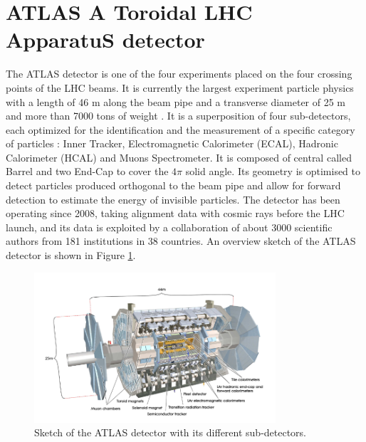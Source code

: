 \section{ATLAS A Toroidal LHC ApparatuS detector}
\label{chap2:ATLAS}
The ATLAS detector is one of the four experiments placed on the four crossing points of the LHC beams. It is currently the largest experiment particle physics with a length of 46 m along the beam pipe and a transverse diameter of 25 m and more than 7000 tons of weight \cite{ATLAS_Exp}. It is a superposition of four sub-detectors, each optimized for the identification and the measurement of a specific category of particles : Inner Tracker, Electromagnetic Calorimeter (ECAL), Hadronic Calorimeter (HCAL) and Muons Spectrometer. It is composed of central called Barrel and two End-Cap to cover the $4\pi$ solid angle. Its geometry is optimised to detect particles produced orthogonal to the beam pipe and allow for forward detection to estimate the energy of invisible particles. The detector has been operating since 2008, taking alignment data with cosmic rays before the LHC launch, and its data is exploited by a collaboration of about 3000 scientific authors from 181 institutions in 38 countries. An overview sketch of the ATLAS detector is shown in Figure \ref{fig:chap2:ATLAS:Img}.
\begin{figure}[ht]
    \centering
    \includegraphics[width=0.8\textwidth]{Ch2/Img/ATLAS_sketch.png}
    \caption{Sketch of the ATLAS detector with its different sub-detectors.}
    \label{fig:chap2:ATLAS:Img}
\end{figure}

